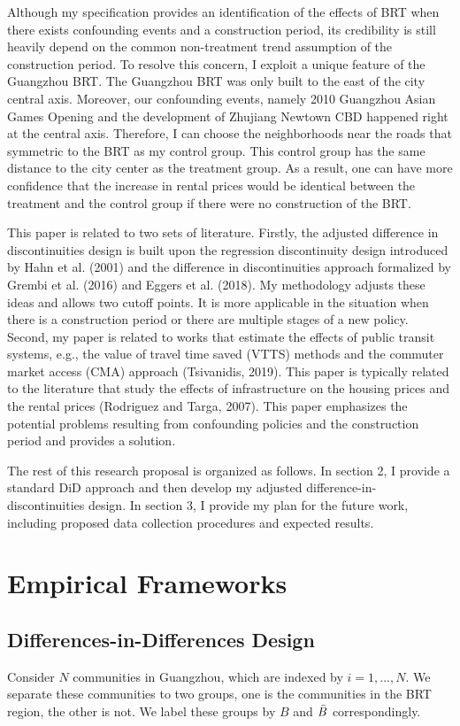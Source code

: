 \documentclass[12pt]{article}
\begin{document}
Although my specification provides an identification of the effects of BRT when there exists confounding events and a construction period, its credibility is still heavily depend on the common non-treatment trend assumption of the construction period. To resolve this concern, I exploit a unique feature of the Guangzhou BRT. The Guangzhou BRT was only built to the east of the city central axis. Moreover, our confounding events, namely 2010 Guangzhou Asian Games Opening and the development of Zhujiang Newtown CBD happened right at the central axis. Therefore, I can choose the neighborhoods near the roads that symmetric to the BRT as my control group. This control group has the same distance to the city center as the treatment group. As a result, one can have more confidence that the increase in rental prices would be identical between the treatment and the control group if there were no construction of the BRT.

This paper is related to two sets of literature. Firstly, the adjusted difference in discontinuities design is built upon the regression discontinuity design introduced by Hahn et al. (2001) and the difference in discontinuities approach formalized by Grembi et al. (2016) and Eggers et al. (2018). My methodology adjusts these ideas and allows two cutoff points. It is more applicable in the situation when there is a construction period or there are multiple stages of a new policy. Second, my paper is related to works that estimate the effects of public transit systems, e.g., the value of travel time saved (VTTS) methods and the commuter market access (CMA)  approach (Tsivanidis, 2019). This paper is typically related to the literature that  study the effects of infrastructure on the housing prices and the rental prices (Rodriguez and Targa, 2007). This paper emphasizes the potential problems resulting from confounding policies and the construction period and provides a solution.

The rest of this research proposal is organized as follows. In section 2, I provide a standard DiD approach and then develop my adjusted difference-in-discontinuities design. In section 3, I provide my plan for the future work, including proposed data collection procedures and expected results. 

\section{Empirical Frameworks}
\subsection{Differences-in-Differences Design}
Consider $N$ communities in Guangzhou, which are indexed by $i = 1, ..., N$. We separate these communities to two groups, one is the communities in the BRT region, the other is not. We label these groups by $B$ and $\Bar{B}$ correspondingly.
\end{document}
